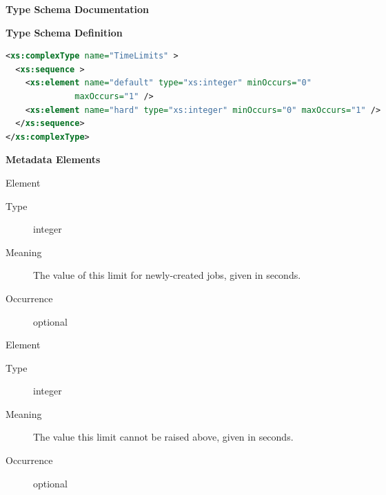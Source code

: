 \documentclass{ivoa}
\begin{document}
\begin{generated}
\begingroup
      	\renewcommand*\descriptionlabel[1]{%
      	\hbox to 5.5em{\emph{#1}\hfil}}\vspace{2ex}\noindent\textbf{ Type Schema Documentation}


\vspace{1ex}\noindent\textbf{ Type Schema Definition}

\begin{lstlisting}[language=XML,basicstyle=\footnotesize]
<xs:complexType name="TimeLimits" >
  <xs:sequence >
    <xs:element name="default" type="xs:integer" minOccurs="0"
              maxOccurs="1" />
    <xs:element name="hard" type="xs:integer" minOccurs="0" maxOccurs="1" />
  </xs:sequence>
</xs:complexType>
\end{lstlisting}

\vspace{0.5ex}\noindent\textbf{ Metadata Elements}

\begingroup\small\begin{bigdescription}\item[Element \xmlel{default}]
\begin{description}
\item[Type] integer
\item[Meaning] 
          The value of this limit for newly-created jobs, given in seconds.
          
\item[Occurrence] optional

\end{description}
\item[Element \xmlel{hard}]
\begin{description}
\item[Type] integer
\item[Meaning] 
          The value this limit cannot be raised above, given in seconds.
          
\item[Occurrence] optional

\end{description}


\end{bigdescription}\endgroup

\endgroup
\end{generated}
\end{document}
